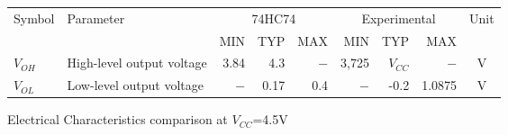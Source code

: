 \begin{tabular}{|l|l|r|r|r|r|r|r|c|}
    \toprule
    Symbol  &Parameter  &\multicolumn{3}{|c|}{74HC74}&\multicolumn{3}{|c|}{Experimental}&Unit\\
            &           &   MIN&TYP&MAX&MIN&TYP&MAX&\\
    \midrule
    $V_{OH}$&High-level output voltage&3.84&4.3&$-$&3,725&$V_{CC}$&$-$&V\\
    $V_{OL}$&Low-level output voltage &$-$&0.17&0.4&$-$&-0.2&1.0875&V\\
    \bottomrule
\end{tabular}
\caption{Electrical Characteristics comparison at $V_{CC}$=4.5V}